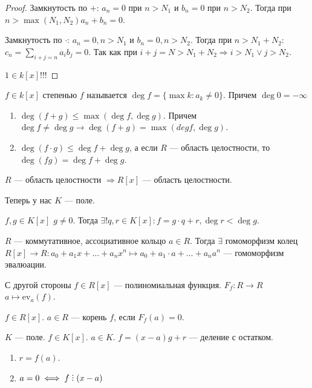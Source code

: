 \begin{proof}
    Замкнутость по $+$:  $a_n = 0$ при  $n > N_1$ и  $b_n = 0$ при $n > N_2$. Тогда при $n > \max(N_1, N_2) a_n+b_n = 0$.

    Замкнутость по $\cdot$:  $a_n = 0, n > N_1$ и $b_n = 0, n > N_2$. Тогда при  $n > N_1+N_2:$ $c_n = \sum_{i+j=n} a_ib_j = 0$. Так как при  $i + j = N > N_1+N_2 \Rightarrow i > N_1 \lor j > N_2$.

    $1 \in k[x]$!!!
\end{proof}
\begin{definition}
    $f \in k[x]$ степенью  $f$ называется  $\deg f = \{\max k: a_k \neq 0\}$. Причем $\deg 0 = -\infty$
\end{definition}
\begin{properties}
    \slashn
    \begin{enumerate}
        \item $\deg (f+g) \le \max(\deg f, \deg g)$. Причем $\deg f \neq \deg g \to \deg(f+g) = \max(deg f, \deg g)$. 
        \item $\deg(f\cdot g) \le \deg f + \deg g$, а если $R$ --- область целостности, то  $\deg (fg) = \deg f + \deg g$.
    \end{enumerate}
\end{properties}
\begin{consequence}
    $R$ --- область целостности  $\Rightarrow R[x]$ --- область целостности.
\end{consequence}
\slashn
Теперь у нас $K$ --- поле.
\begin{theorem}
    $f, g \in K[x]$ $g \neq 0$. Тогда  $\exists! q, r \in K[x]: f = g\cdot q + r, \deg r < \deg g$.
\end{theorem}
\begin{consequence}
    $R$ --- коммутативное, ассоциативное кольцо  $a \in R$. Тогда $\exists$ гомоморфизм колец  $R[x] \to R: a_0 + a_1 x + \ldots + a_n x^n \mapsto a_0 + a_1 \cdot a + \ldots + a_n a^n$ --- гомоморфизм эвалюации. 

    С другой стороны $f \in R[x]$ --- полиномиальная функция.  $F_f: R \to R$  $a \mapsto \text{ev}_a(f)$.
\end{consequence}
\begin{definition}
    $f \in R[x]$.  $a\in R$ --- корень  $f$, если  $F_f(a) = 0$.
\end{definition}
\begin{theorem}[Безу]
    $K$ --- поле.  $f \in K[x]$. $a \in K$. $f = (x-a)g + r$ --- деление с остатком.
    \begin{enumerate}
        \item $r = f(a)$.
        \item  $a = 0 \iff f \divby (x-a)$
    \end{enumerate}
\end{theorem}
